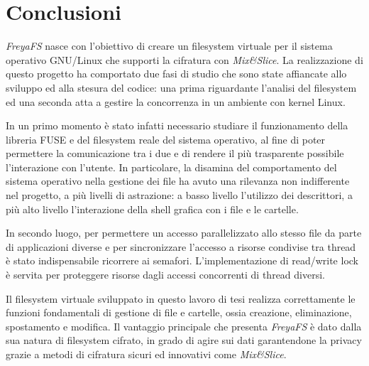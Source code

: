 \documentclass[a4paper,12pt,twoside,openright]{report}
\begin{document}

  \chapter{Conclusioni}
  \thispagestyle{fancy}

  \textit{FreyaFS} nasce con l'obiettivo di creare un filesystem virtuale per
  il sistema operativo \mbox{GNU/Linux} che supporti la cifratura con \textit{Mix\&Slice}.
  La realizzazione di questo progetto ha comportato due fasi di studio che sono state affiancate
  allo sviluppo ed alla stesura del codice:
  una prima riguardante l'analisi del filesystem ed una seconda atta a gestire la concorrenza
  in un ambiente con kernel Linux.
  
  In un primo momento è stato infatti necessario studiare il funzionamento della libreria FUSE e del filesystem reale del sistema operativo,
  al fine di poter permettere la comunicazione tra i due e di rendere il più trasparente possibile l'interazione
  con l'utente. In particolare, la disamina del comportamento del sistema operativo nella gestione
  dei file ha avuto una rilevanza non indifferente nel progetto, a più livelli di astrazione:
  a basso livello l'utilizzo dei descrittori, a più alto livello
  l'interazione della shell grafica con i file e le cartelle.

  In secondo luogo, per permettere un accesso parallelizzato 
  allo stesso file da parte di applicazioni diverse e per sincronizzare l'accesso
  a risorse condivise tra thread è stato indispensabile ricorrere ai semafori.
  L'implementazione di read/write lock è servita per proteggere risorse dagli accessi
  concorrenti di thread diversi.

  Il filesystem virtuale sviluppato in questo lavoro di tesi realizza correttamente
  le funzioni fondamentali di gestione di file e cartelle, ossia creazione, eliminazione,
  spostamento e modifica.
  Il vantaggio principale che presenta \textit{FreyaFS} è dato dalla sua natura di filesystem cifrato,
  in grado di agire sui dati garantendone la privacy grazie a metodi di cifratura
  sicuri ed innovativi come \textit{Mix\&Slice}.

\end{document}
